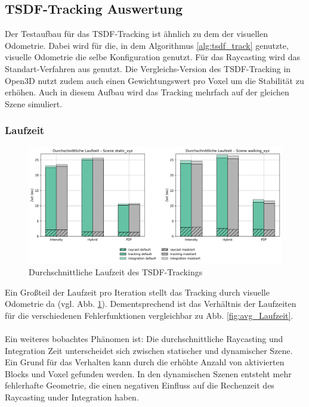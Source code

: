 \documentclass[12pt,DIV=15,BCOR=15mm,twoside,headsepline,abstract=true,listof=totoc,bibliography=totoc]{scrreprt}
\theoremstyle{remark}    %
\begin{document}
    \subsection{TSDF-Tracking Auswertung}
    Der Testaufbau für das \ac{TSDF}-Tracking ist ähnlich zu dem der visuellen Odometrie.
    Dabei wird für die, in dem Algorithmus \ref{alg:tsdf_track} genutzte, visuelle Odometrie die selbe Konfiguration genutzt. Für das Raycasting wird das 
    Standart-Verfahren aus \cite{dong2023ashmodernframeworkparallel,Zhou2018} genutzt. Die Vergleichs-Version des \ac{TSDF}-Tracking in Open3D nutzt zudem auch einen
    Gewichtungswert pro Voxel um die Stabilität zu erhöhen. Auch in diesem Aufbau wird das Tracking mehrfach auf der gleichen Szene simuliert.
    
    \subsubsection{Laufzeit}
    \begin{figure}[h]
        \centering
        \includegraphics[width=\textwidth]{pics/tsdf_time_avg_split.png}
        \caption{Durchschnittliche Laufzeit des \ac{TSDF}-Trackings}
        \label{fig:tsdf_avg_time}
    \end{figure}\noindent
    Ein Großteil der Laufzeit pro Iteration stellt das Tracking durch visuelle Odometrie da (vgl. Abb. \ref{fig:tsdf_avg_time}). Dementsprechend ist das 
    Verhältnis der Laufzeiten für die verschiedenen Fehlerfunktionen vergleichbar zu Abb. \ref{fig:avg_Laufzeit}. \\\\
    Ein weiteres bobachtes Phänomen ist: Die durchschnittliche Raycasting und Integration Zeit unterscheidet sich zwischen statischer und dynamischer
    Szene. Ein Grund für das Verhalten kann durch die erhöhte Anzahl von aktivierten Blocks und Voxel gefunden werden. In den dynamischen Szenen entsteht
    mehr fehlerhafte Geometrie, die einen negativen Einfluss auf die Rechenzeit des Raycasting under Integration haben. \\\\
\end{document}
